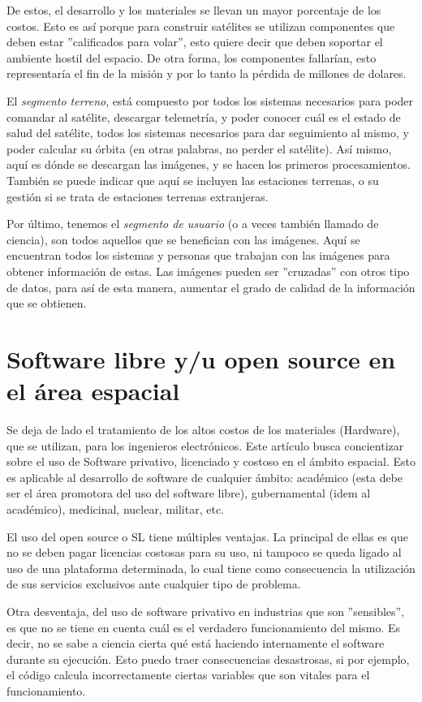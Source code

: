 \documentclass[12pt]{article}
\begin{document}
De estos, el desarrollo y los materiales se llevan un mayor porcentaje de los costos. Esto es así porque para construir satélites se utilizan componentes que deben estar ''calificados para volar'', esto quiere decir que deben soportar el ambiente hostil del espacio. De otra forma, los componentes fallarían, esto representaría el fin de la misión y por lo tanto la pérdida de millones de dolares. 

El \textit{segmento terreno}, está compuesto por todos los sistemas necesarios para poder comandar al satélite, descargar telemetría, y poder conocer cuál es el estado de salud del satélite, todos los sistemas necesarios para dar seguimiento al mismo, y poder calcular su órbita (en otras palabras, no perder el satélite). Así mismo, aquí es dónde se descargan las imágenes, y se hacen los primeros procesamientos. También se puede indicar que aquí se incluyen las estaciones terrenas, o su gestión si se trata de estaciones terrenas extranjeras.

Por último, tenemos el \textit{segmento de usuario} (o a veces también llamado de ciencia), son todos aquellos que se benefician con las imágenes. Aquí se encuentran todos los sistemas y personas que trabajan con las imágenes para obtener información de estas. Las imágenes pueden ser ''cruzadas'' con otros tipo de datos, para así de esta manera, aumentar el grado de calidad de la información que se obtienen. 

\section{Software libre y/u open source en el área espacial}
Se deja de lado el tratamiento de los altos costos de los materiales (Hardware), que se utilizan, para los ingenieros electrónicos. Este artículo busca concientizar sobre el uso de Software privativo, licenciado y costoso en el ámbito espacial. Esto es aplicable al desarrollo de software de cualquier ámbito: académico (esta debe ser el área promotora del uso del software libre), gubernamental (idem al académico), medicinal, nuclear, militar, etc.  

El uso del open source o SL tiene múltiples ventajas. La principal de ellas es que no se deben pagar licencias costosas para su uso, ni tampoco se queda ligado al uso de una plataforma determinada, lo cual tiene como consecuencia la utilización de sus servicios exclusivos ante cualquier tipo de problema. 

Otra desventaja, del uso de software privativo en industrias que son ''sensibles'', es que no se tiene en cuenta cuál es el verdadero funcionamiento del mismo. Es decir, no se sabe a ciencia cierta qué está haciendo internamente el software durante su ejecución. Esto puedo traer consecuencias desastrosas, si por ejemplo, el código calcula incorrectamente ciertas variables que son vitales para el funcionamiento.
\end{document}
